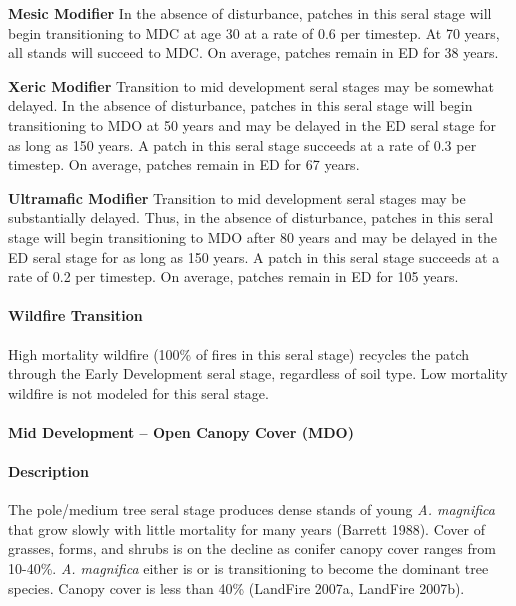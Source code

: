 \begin{adjustwidth}{2cm}{}

\noindent \textbf{Mesic Modifier } In the absence of disturbance, patches in this seral stage will begin transitioning to MDC at age 30 at a rate of 0.6 per timestep. At 70 years, all stands will succeed to MDC. On average, patches remain in ED for 38 years.

\medskip
\noindent \textbf{Xeric Modifier}  Transition to mid development seral stages may be somewhat delayed. In the absence of disturbance, patches in this seral stage will begin transitioning to MDO at 50 years and may be delayed in the ED seral stage for as long as 150 years. A patch in this seral stage succeeds at a rate of 0.3 per timestep. On average, patches remain in ED for 67 years.

\medskip
\noindent \textbf{Ultramafic Modifier}  Transition to mid development seral stages may be substantially delayed. Thus, in the absence of disturbance, patches in this seral stage will begin transitioning to MDO after 80 years and may be delayed in the ED seral stage for as long as 150 years. A patch in this seral stage succeeds at a rate of 0.2 per timestep. On average, patches remain in ED for 105 years.

\end{adjustwidth}



\paragraph{Wildfire Transition} High mortality wildfire (100\% of fires in this seral stage) recycles the patch through the Early Development seral stage, regardless of soil type. Low mortality wildfire is not modeled for this seral stage.

\noindent\hrulefill


\paragraph{Mid Development – Open Canopy Cover (MDO)} 

\paragraph{Description} The pole/medium tree seral stage produces dense stands of young \emph{A. magnifica} that grow slowly with little mortality for many years (Barrett 1988). Cover of grasses, forms, and shrubs is on the decline as conifer canopy cover ranges from 10-40\%. \emph{A. magnifica} either is or is transitioning to become the dominant tree species. Canopy cover is less than 40\% (LandFire 2007a, LandFire 2007b).

